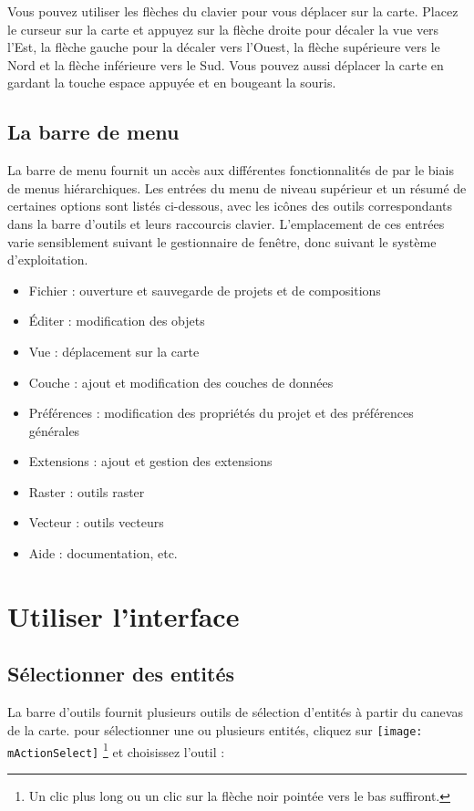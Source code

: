 Vous pouvez utiliser les flèches du clavier pour vous déplacer sur la carte. Placez le curseur sur la carte et appuyez sur la flèche droite pour décaler la vue vers l'Est, la flèche gauche pour la décaler vers l'Ouest, la flèche supérieure vers le Nord et la flèche inférieure vers le Sud. Vous pouvez aussi déplacer la carte en gardant la touche espace appuyée et en bougeant la souris.

\subsection{La barre de menu}
La barre de menu fournit un accès aux différentes fonctionnalités de \qg par le biais de menus hiérarchiques. Les entrées du menu de niveau supérieur et un résumé de certaines options sont listés ci-dessous, avec les icônes des outils correspondants dans la barre d'outils et leurs raccourcis clavier. L'emplacement de ces entrées varie sensiblement suivant le gestionnaire de fenêtre, donc suivant le système d'exploitation. 

\begin{itemize}
\item Fichier : ouverture et sauvegarde de projets et de compositions
\item Éditer : modification des objets
\item Vue : déplacement sur la carte
\item Couche : ajout et modification des couches de données
\item Préférences : modification des propriétés du projet et des préférences générales
\item Extensions : ajout et gestion des extensions
\item Raster : outils raster
\item Vecteur : outils vecteurs
\item Aide : documentation, etc.
\end{itemize}
       
\section{Utiliser l'interface}\label{sec:ui_use} 

\subsection{Sélectionner des entités}\label{sec:selection}

La barre d'outils fournit plusieurs outils de sélection d'entités à partir du canevas de la carte. pour sélectionner une ou plusieurs entités, cliquez  sur \texttt{[image: mActionSelect]} \footnote{Un clic plus long ou un clic sur la flèche noir pointée vers le bas suffiront.} et choisissez l'outil :

